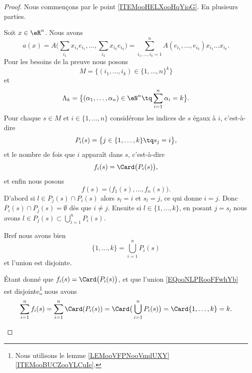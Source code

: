 \begin{proof}
	Nous commençons par le point \ref{ITEMooHELXooHqYioG}. En plusieurs parties.
	\begin{subproof}
		Soit \( x\in \eR^n\). Nous avons
		\begin{equation}		\label{EQooAJCPooQnXdyI}
			a(x)=A\big( \sum_{i_1}x_{i_1}e_{i_1},\ldots,\sum_{i_k}x_{i_k}e_{i_k} \big)=\sum_{i_1,\ldots,i_k=1}^nA(e_{i_1},\ldots,e_{i_k})x_{i_1}\ldots x_{i_k}.
		\end{equation}
		Pour les besoins de la preuve nous posons
		\begin{equation}
			M=\big\{ (i_1,\ldots,i_k)\in \{ 1,\ldots,n \}^k \big\}
		\end{equation}
		et
		\begin{equation}
			\Lambda_k=\big\{  (\alpha_1,\ldots,\alpha_n)\in \eN^n\tq\sum_{i=1}^n\alpha_i=k  \big\}.
		\end{equation}
		Pour chaque \( s\in M\) et \( i\in\{ 1,\ldots,n \}\) considérons les indices de \( s\) égaux à \( i\), c'est-à-dire
		\begin{equation}
			P_i(s)=\big\{ j\in \{ 1,\ldots,k \}\tq s_j=i  \big\},
		\end{equation}
		et le nombre de fois que \( i\) apparaît dans \( s\), c'est-à-dire
		\begin{equation}
			f_i(s)=\Card\big( P_i(s) \big),
		\end{equation}
		et enfin nous posons
		\begin{equation}
			f(s)=\big( f_1(s),\ldots,f_n(s) \big).
		\end{equation}
		D'abord si \( l\in P_j(s)\cap P_i(s)\) alors \( s_l=i\) et \( s_l=j\), ce qui donne \( i=j\). Donc \( P_i(s)\cap P_j(s)=\emptyset\) dès que \( i\neq j\). Ensuite si \( l\in \{ 1,\ldots,k \}\), en posant \( j=s_l\) nous avons \( l\in P_j(s)\subset\bigcup_{i=1}^nP_i(s)\).

		Bref nous avons bien
		\begin{equation}		\label{EQooNLPRooFFwhYb}
			\{ 1,\ldots,k \}=\bigcup_{i=1}^nP_i(s)
		\end{equation}
		et l'union est disjointe.

		\spitem[\( f(s)\in \Lambda_k\)]
		Étant donné que \( f_i(s)=\Card\big( P_i(s) \big)\), et que l'union \eqref{EQooNLPRooFFwhYb} est disjointe\footnote{Nous utilisons le lemme \ref{LEMooVFPNooVmdUXY}\ref{ITEMooBUCZooYLCuIe}.} nous avons
		\begin{equation}
			\sum_{i=1}^nf_i(s)=\sum_{i=1}^n\Card(P_i(s))=\Card\big( \bigcup_{i=1}^nP_i(s) \big)=\Card\{ 1,\ldots,k \}=k.
		\end{equation}


\end{subproof}
\end{proof}
